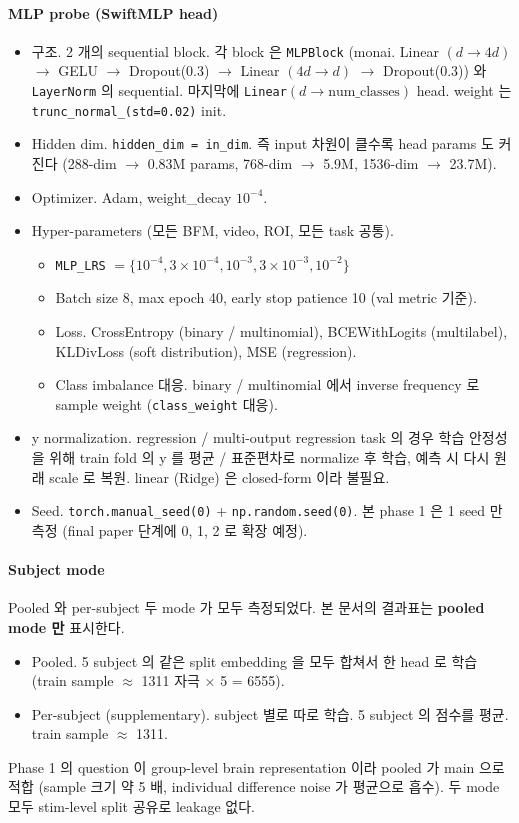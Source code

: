 \documentclass[a4paper,11pt]{article}
\begin{document}
\paragraph{MLP probe (SwiftMLP head)}
\begin{itemize}[leftmargin=*, itemsep=2pt]
  \item 구조. 2 개의 sequential block. 각 block 은 \texttt{MLPBlock} (monai. Linear $(d \to 4d)$ $\to$ GELU $\to$ Dropout(0.3) $\to$ Linear $(4d \to d)$ $\to$ Dropout(0.3)) 와 \texttt{LayerNorm} 의 sequential. 마지막에 \texttt{Linear}$(d \to \text{num\_classes})$ head. weight 는 \texttt{trunc\_normal\_(std=0.02)} init.
  \item Hidden dim. \texttt{hidden\_dim = in\_dim}. 즉 input 차원이 클수록 head params 도 커진다 (288-dim $\to$ 0.83M params, 768-dim $\to$ 5.9M, 1536-dim $\to$ 23.7M).
  \item Optimizer. Adam, weight\_decay $10^{-4}$.
  \item Hyper-parameters (모든 BFM, video, ROI, 모든 task 공통).
    \begin{itemize}
      \item \texttt{MLP\_LRS} $= \{10^{-4}, 3{\times}10^{-4}, 10^{-3}, 3{\times}10^{-3}, 10^{-2}\}$
      \item Batch size 8, max epoch 40, early stop patience 10 (val metric 기준).
      \item Loss. CrossEntropy (binary / multinomial), BCEWithLogits (multilabel), KLDivLoss (soft distribution), MSE (regression).
      \item Class imbalance 대응. binary / multinomial 에서 inverse frequency 로 sample weight (\texttt{class\_weight} 대응).
    \end{itemize}
  \item y normalization. regression / multi-output regression task 의 경우 학습 안정성을 위해 train fold 의 y 를 평균 / 표준편차로 normalize 후 학습, 예측 시 다시 원래 scale 로 복원. linear (Ridge) 은 closed-form 이라 불필요.
  \item Seed. \texttt{torch.manual\_seed(0)} + \texttt{np.random.seed(0)}. 본 phase 1 은 1 seed 만 측정 (final paper 단계에 0, 1, 2 로 확장 예정).
\end{itemize}

\paragraph{Subject mode} Pooled 와 per-subject 두 mode 가 모두 측정되었다. 본 문서의 결과표는 \textbf{pooled mode 만} 표시한다.
\begin{itemize}[leftmargin=*, itemsep=2pt]
  \item Pooled. 5 subject 의 같은 split embedding 을 모두 합쳐서 한 head 로 학습 (train sample $\approx$ 1311 자극 $\times$ 5 = 6555).
  \item Per-subject (supplementary). subject 별로 따로 학습. 5 subject 의 점수를 평균. train sample $\approx$ 1311.
\end{itemize}
Phase 1 의 question 이 group-level brain representation 이라 pooled 가 main 으로 적합 (sample 크기 약 5 배, individual difference noise 가 평균으로 흡수). 두 mode 모두 stim-level split 공유로 leakage 없다.
\end{document}
